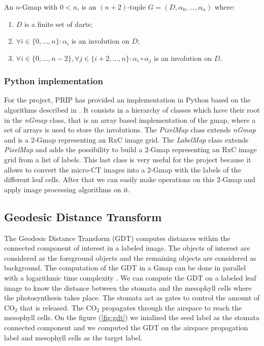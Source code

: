 \begin{definition}[$n$-Gmap]
    An $n$-Gmap with $0<n$, is an $(n+2)$-tuple $G=(D,\alpha_0,\ldots,\alpha_{n})$ where:
    \begin{enumerate}
        \item $D$ is a finite set of darts;
        \item $\forall i\in\{0,\ldots,n\}:\alpha_i$ is an involution on $D$;
        \item $\forall i\in\{0,\ldots,n-2\},\forall j\in\{i+2,\ldots,n\}:
        \alpha_i \circ \alpha_j$ is an involution on $D$.
    \end{enumerate}
    \label{definition:gmap}
\end{definition}

\subsubsection{Python implementation}

For the project, PRIP has provided an implementation in Python based on the algorithms 
described in \cite{Lienhardt}. It consists in a hierarchy of classes which have their
root in the \textit{nGmap} class, that is an array based implementation of the
gmap, where a set of arrays is used to store the involutions. The \textit{PixelMap} class 
extends \textit{nGmap} and is a 2-Gmap representing an RxC image grid. The 
\textit{LabelMap} class extends \textit{PixelMap} and adds the possibility to build a 
2-Gmap representing an RxC image grid from a list of labels. This last class is very
useful for the project because it allows to convert the micro-CT images into a 2-Gmap
with the labels of the different leaf cells. After that we can easily make operations
on this 2-Gmap and apply image processing algorithms on it.

\subsection{Geodesic Distance Transform}

The Geodesic Distance Transform (GDT) computes distances within the connected
component of interest in a labeled image. The objects of interest are considered as
the foreground objects and the remaining objects are considered as background.
The computation of the GDT in a Gmap can be done in parallel with a logarithmic
time complexity \cite{Banaeyan}. We can compute the GDT on a labeled leaf image
to know the distance between the stomata and the mesophyll cells where the 
photosynthesis takes place. The stomata act as gates to control the amount of
$\mathrm{CO_2}$ that is released. The $\mathrm{CO_2}$ propagates through the
airspace to reach the mesophyll cells. On the figure (\ref{fig:gdt}) we inialized
the seed label as the stomata connected component and we computed the GDT
on the airspace propagation label and mesophyll cells as the target label.

